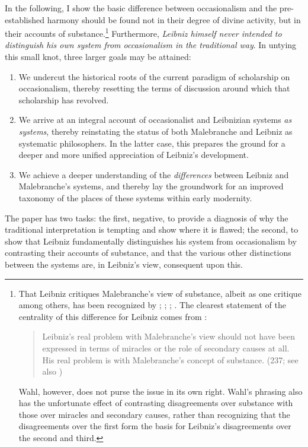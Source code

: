 \documentclass{article}
\begin{document}
In the following, I show the basic difference between occasionalism and
the pre-established harmony should be found not in their degree of
divine activity, but in their accounts of substance.\footnote{That
  Leibniz critiques Malebranche's view of substance, albeit as one
  critique among others, has been recognized by \autocite[40]{Rutherford1993};
  \autocite[299-301]{Garber1995}; \autocite[193-194]{Garber2009}; \autocite[280-281, fn. 16]{Brown2000}. The
  clearest statement of the centrality of this difference for Leibniz
  comes from \autocite{Wahl2011}:

  \begin{quote}
  Leibniz's real problem with Malebranche's view should not have been
  expressed in terms of miracles or the role of secondary causes at all.
  His real problem is with Malebranche's concept of substance. (237; see
  also \autocite{Whipple2010})
  \end{quote}

  Wahl, however, does not purse the issue in its own right. Wahl's
  phrasing also has the unfortunate effect of contrasting disagreements
  over substance with those over miracles and secondary causes, rather
  than recognizing that the disagreements over the first form the basis
  for Leibniz's disagreements over the second and third.} Furthermore,
\emph{Leibniz himself never intended to distinguish his own system from
occasionalism in the traditional way}. In untying this small knot, three
larger goals may be attained:

\begin{enumerate}
\item We undercut the historical roots of the current paradigm of
  scholarship on occasionalism, thereby resetting the terms of
  discussion around which that scholarship has revolved.
\item We arrive at an integral account of occasionalist and Leibnizian
  systems \emph{as systems}, thereby reinstating the status of both
  Malebranche and Leibniz as systematic philosophers. In the latter
  case, this prepares the ground for a deeper and more unified
  appreciation of Leibniz's development.
\item We achieve a deeper understanding of the \emph{differences} between
  Leibniz and Malebranche's systems, and thereby lay the groundwork for
  an improved taxonomy of the places of these systems within early
  modernity.
\end{enumerate}

The paper has two tasks: the first, negative, to provide a diagnosis of
why the traditional interpretation is tempting and show where it is
flawed; the second, to show that Leibniz fundamentally distinguishes his
system from occasionalism by contrasting their accounts of substance,
and that the various other distinctions between the systems are, in
Leibniz's view, consequent upon this.
\end{document}
